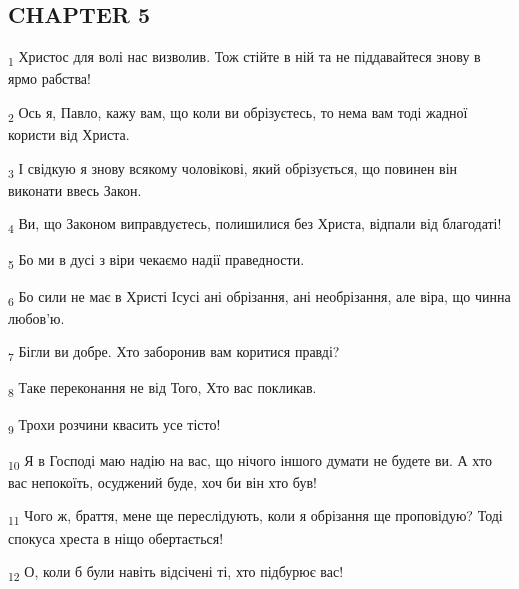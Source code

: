 \subsection{CHAPTER 5}
\begin{tcolorbox}
\textsubscript{1} Христос для волі нас визволив. Тож стійте в ній та не піддавайтеся знову в ярмо рабства!
\end{tcolorbox}
\begin{tcolorbox}
\textsubscript{2} Ось я, Павло, кажу вам, що коли ви обрізуєтесь, то нема вам тоді жадної користи від Христа.
\end{tcolorbox}
\begin{tcolorbox}
\textsubscript{3} І свідкую я знову всякому чоловікові, який обрізується, що повинен він виконати ввесь Закон.
\end{tcolorbox}
\begin{tcolorbox}
\textsubscript{4} Ви, що Законом виправдуєтесь, полишилися без Христа, відпали від благодаті!
\end{tcolorbox}
\begin{tcolorbox}
\textsubscript{5} Бо ми в дусі з віри чекаємо надії праведности.
\end{tcolorbox}
\begin{tcolorbox}
\textsubscript{6} Бо сили не має в Христі Ісусі ані обрізання, ані необрізання, але віра, що чинна любов'ю.
\end{tcolorbox}
\begin{tcolorbox}
\textsubscript{7} Бігли ви добре. Хто заборонив вам коритися правді?
\end{tcolorbox}
\begin{tcolorbox}
\textsubscript{8} Таке переконання не від Того, Хто вас покликав.
\end{tcolorbox}
\begin{tcolorbox}
\textsubscript{9} Трохи розчини квасить усе тісто!
\end{tcolorbox}
\begin{tcolorbox}
\textsubscript{10} Я в Господі маю надію на вас, що нічого іншого думати не будете ви. А хто вас непокоїть, осуджений буде, хоч би він хто був!
\end{tcolorbox}
\begin{tcolorbox}
\textsubscript{11} Чого ж, браття, мене ще переслідують, коли я обрізання ще проповідую? Тоді спокуса хреста в ніщо обертається!
\end{tcolorbox}
\begin{tcolorbox}
\textsubscript{12} О, коли б були навіть відсічені ті, хто підбурює вас!
\end{tcolorbox}
